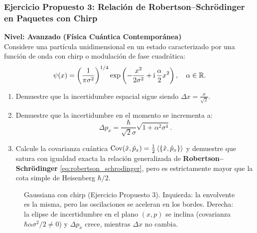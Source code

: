 \subsubsection[Ejercicio 3: Robertson--Schrödinger y chirp]{Ejercicio Propuesto 3: Relación de Robertson--Schrödinger en Paquetes con Chirp}
\begin{ejerciciobox}
    \textbf{Nivel: Avanzado (Física Cuántica Contemporánea)}\\
    Considere una partícula unidimensional en un estado caracterizado por una función de onda con chirp o modulación de fase cuadrática:
    \begin{equation}
        \psi(x) = \left(\frac{1}{\pi\sigma^2}\right)^{1/4}\exp\left(-\frac{x^2}{2\sigma^2} + \mathrm{i}\,\frac{\alpha}{2}x^2\right), \quad \alpha \in \mathbb{R}.
    \end{equation}
    \begin{enumerate}
        \item Demuestre que la incertidumbre espacial sigue siendo $\Delta x = \frac{\sigma}{\sqrt{2}}$.
        \item Demuestre que la incertidumbre en el momento se incrementa a:
        \begin{equation}
            \Delta p_x = \frac{\hbar}{\sqrt{2}\sigma}\sqrt{1 + \alpha^2\sigma^4}.
        \end{equation}
        \item Calcule la covarianza cuántica $\mathrm{Cov}(\hat{x}, \hat{p}_x) = \frac{1}{2}\left\langle \{\hat{x}, \hat{p}_x\} \right\rangle$ y demuestre que satura con igualdad exacta la relación generalizada de \textbf{Robertson--Schrödinger} \eqref{eq:robertson_schrodinger}, pero es estrictamente mayor que la cota simple de Heisenberg $\hbar/2$.
    \end{enumerate}
\end{ejerciciobox}

\begin{figure}[H]
    \centering
    
    \caption{Gaussiana con chirp (Ejercicio Propuesto 3). Izquierda: la envolvente es la misma, pero las oscilaciones se aceleran en los bordes. Derecha: la elipse de incertidumbre en el plano $(x,p)$ se inclina (covarianza $\hbar\alpha\sigma^2/2\neq0$) y $\Delta p_x$ crece, mientras $\Delta x$ no cambia.}
    \label{fig:chirp}
\end{figure}

